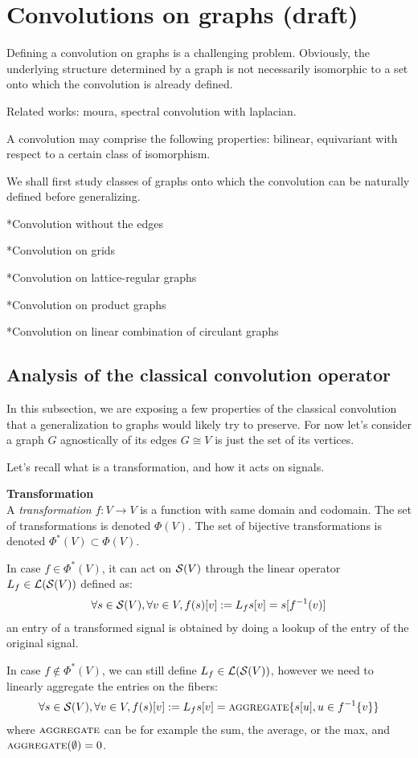 \section{Convolutions on graphs (draft)}

Defining a convolution on graphs is a challenging problem. Obviously, the underlying structure determined by a graph is not necessarily isomorphic to a set onto which the convolution is already defined. 

Related works: moura, spectral convolution with laplacian.

A convolution may comprise the following properties: bilinear, equivariant with respect to a certain class of isomorphism.

We shall first study classes of graphs onto which the convolution can be naturally defined before generalizing.

*Convolution without the edges

*Convolution on grids

*Convolution on lattice-regular graphs

*Convolution on product graphs

*Convolution on linear combination of circulant graphs


\subsection{Analysis of the classical convolution operator}

In this subsection, we are exposing a few properties of the classical convolution that a generalization to graphs would likely try to preserve. For now let's consider a graph $G$ agnostically of its edges \ie $G \cong V$ is just the set of its vertices.

Let's recall what is a transformation, and how it acts on signals.

\begin{definition}\textbf{Transformation}\\
A \emph{transformation} $f: V \rightarrow V$ is a function with same domain and codomain. The set of transformations is denoted $\Phi(V)$. The set of bijective transformations is denoted $\Phi^*(V) \subset \Phi(V)$.

In case $f \in \Phi^*(V)$, it can act on $\mathcal{S}(V)$ through the linear operator $L_f \in \mathcal{L}(\mathcal{S}(V))$ defined as:
\begin{gather*}
\forall s \in \mathcal{S}(V), \forall v \in V, f(s)[v] := L_f s[v] = s[f^{-1}(v)]
\end{gather*}
\ie an entry of a transformed signal is obtained by doing a lookup of the entry of the original signal.

In case $f \notin \Phi^*(V)$, we can still define $L_f \in \mathcal{L}(\mathcal{S}(V))$, however we need to linearly aggregate the entries on the fibers:
\begin{gather*}
\forall s \in \mathcal{S}(V), \forall v \in V, f(s)[v] := L_f s[v] = \operatorname{\textsc{aggregate}}\{s[u], u \in f^{-1}\{v\}\}
\end{gather*}
where $\operatorname{\textsc{aggregate}}$ can be for example the sum, the average, or the max, and $\operatorname{\textsc{aggregate}}(\emptyset) = 0$.
\end{definition}

